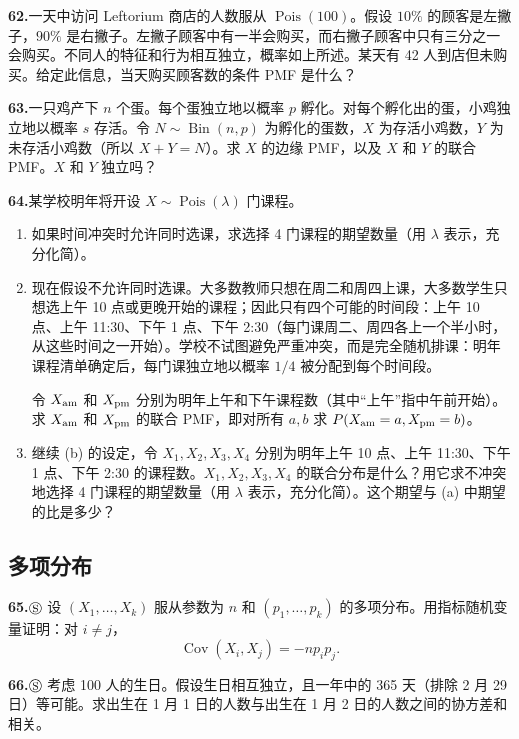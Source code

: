 \documentclass[UTF8,12pt,a4paper,fontset=fandol]{ctexart}
\begin{document}
\noindent\textbf{62.}\quad 一天中访问 Leftorium 商店的人数服从 $\operatorname{Pois}(100)$。假设 $10\%$ 的顾客是左撇子，$90\%$ 是右撇子。左撇子顾客中有一半会购买，而右撇子顾客中只有三分之一会购买。不同人的特征和行为相互独立，概率如上所述。某天有 42 人到店但未购买。给定此信息，当天购买顾客数的条件 PMF 是什么？

\noindent\textbf{63.}\quad 一只鸡产下 $n$ 个蛋。每个蛋独立地以概率 $p$ 孵化。对每个孵化出的蛋，小鸡独立地以概率 $s$ 存活。令 $N\sim \operatorname{Bin}(n,p)$ 为孵化的蛋数，$X$ 为存活小鸡数，$Y$ 为未存活小鸡数（所以 $X+Y=N$）。求 $X$ 的边缘 PMF，以及 $X$ 和 $Y$ 的联合 PMF。$X$ 和 $Y$ 独立吗？

\noindent\textbf{64.}\quad 某学校明年将开设 $X\sim \operatorname{Pois}(\lambda)$ 门课程。
\begin{enumerate}
  \item[(a)] 如果时间冲突时允许同时选课，求选择 4 门课程的期望数量（用 $\lambda$ 表示，充分化简）。
  \item[(b)] 现在假设不允许同时选课。大多数教师只想在周二和周四上课，大多数学生只想选上午 10 点或更晚开始的课程；因此只有四个可能的时间段：上午 10 点、上午 11:30、下午 1 点、下午 2:30（每门课周二、周四各上一个半小时，从这些时间之一开始）。学校不试图避免严重冲突，而是完全随机排课：明年课程清单确定后，每门课独立地以概率 $1/4$ 被分配到每个时间段。

  令 $X_{\rm am}$ 和 $X_{\rm pm}$ 分别为明年上午和下午课程数（其中“上午”指中午前开始）。求 $X_{\rm am}$ 和 $X_{\rm pm}$ 的联合 PMF，即对所有 $a,b$ 求 $P(X_{\rm am}=a,X_{\rm pm}=b)$。
  \item[(c)] 继续 (b) 的设定，令 $X_1,X_2,X_3,X_4$ 分别为明年上午 10 点、上午 11:30、下午 1 点、下午 2:30 的课程数。$X_1,X_2,X_3,X_4$ 的联合分布是什么？用它求不冲突地选择 4 门课程的期望数量（用 $\lambda$ 表示，充分化简）。这个期望与 (a) 中期望的比是多少？
\end{enumerate}

\subsection*{多项分布}

\noindent\textbf{65.}\quad $\circledS$ 设 $(X_1,\ldots,X_k)$ 服从参数为 $n$ 和 $(p_1,\ldots,p_k)$ 的多项分布。用指标随机变量证明：对 $i\ne j$，
\[
  \operatorname{Cov}(X_i,X_j)=-np_ip_j.
\]

\noindent\textbf{66.}\quad $\circledS$ 考虑 100 人的生日。假设生日相互独立，且一年中的 365 天（排除 2 月 29 日）等可能。求出生在 1 月 1 日的人数与出生在 1 月 2 日的人数之间的协方差和相关。
\end{document}
